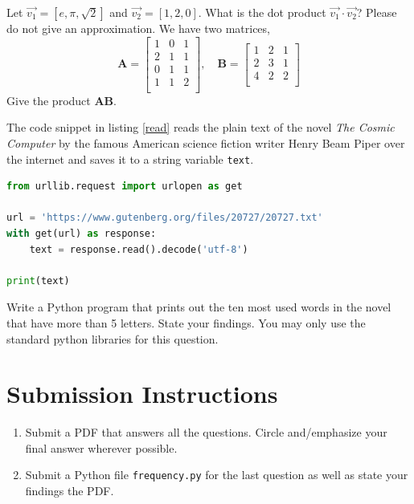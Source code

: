 \documentclass{homework}
\begin{document}
\question Let $\vec{v_1} = [e, \pi, \sqrt{2}]$ and $\vec{v_2} = [1, 2, 0]$. What is the dot product $\vec{v_1} \cdot \vec{v_2}$? Please do not give an approximation.
\question We have two matrices,
\[
  \mathbf{A} = \begin{bmatrix} 1 & 0 & 1 \\   2 & 1 & 1 \\   0 & 1 & 1 \\   1 & 1 & 2 \\   \end{bmatrix}, \quad
  \mathbf{B} = \begin{bmatrix} 1 & 2 & 1 \\   2 & 3 & 1 \\   4 & 2 & 2 \\   \end{bmatrix}
\]
Give the product $\mathbf{AB}$.

\question The code snippet in listing \ref{read} reads the plain text of the novel \textit{The Cosmic Computer} by the famous American science fiction writer Henry Beam Piper over the internet and saves it to a string variable \texttt{text}.

\begin{lstlisting}[language=python, label=read]
from urllib.request import urlopen as get

url = 'https://www.gutenberg.org/files/20727/20727.txt'
with get(url) as response:
    text = response.read().decode('utf-8')

print(text)
\end{lstlisting}

Write a Python program that prints out the ten most used words in the novel that have more than 5 letters. State your findings. You may only use the standard python libraries for this question.

\section*{Submission Instructions}

\begin{enumerate}
    \item Submit a PDF that answers all the questions. Circle and/emphasize your final answer wherever possible.
    \item Submit a Python file \eg \texttt{frequency.py} for the last question as well as state your findings the PDF.
\end{enumerate}
\end{document}
